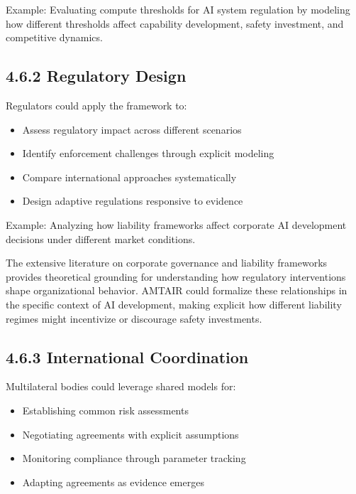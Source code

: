 \documentclass[
  11pt,
  letterpaper,
  openany]{book}
\providecommand{\tightlist}{%
  \setlength{\itemsep}{0pt}\setlength{\parskip}{0pt}}
\begin{document}
Example: Evaluating compute thresholds for AI system regulation by
modeling how different thresholds affect capability development, safety
investment, and competitive dynamics.

\subsection{4.6.2 Regulatory Design}\label{sec-regulatory-integration}

Regulators could apply the framework to:

\begin{itemize}
\tightlist
\item
  Assess regulatory impact across different scenarios
\item
  Identify enforcement challenges through explicit modeling
\item
  Compare international approaches systematically
\item
  Design adaptive regulations responsive to evidence
\end{itemize}

Example: Analyzing how liability frameworks affect corporate AI
development decisions under different market conditions.

The extensive literature on corporate governance and liability
frameworks \textcite{cuomo2016} \textcite{demirag2000}
\textcite{devilliers2021} \textcite{divito2022} \textcite{kaur2024}
\textcite{list2011} \textcite{solomon2020} provides theoretical
grounding for understanding how regulatory interventions shape
organizational behavior. AMTAIR could formalize these relationships in
the specific context of AI development, making explicit how different
liability regimes might incentivize or discourage safety investments.

\subsection{4.6.3 International
Coordination}\label{sec-international-integration}

Multilateral bodies could leverage shared models for:

\begin{itemize}
\tightlist
\item
  Establishing common risk assessments
\item
  Negotiating agreements with explicit assumptions
\item
  Monitoring compliance through parameter tracking
\item
  Adapting agreements as evidence emerges
\end{itemize}
\end{document}
